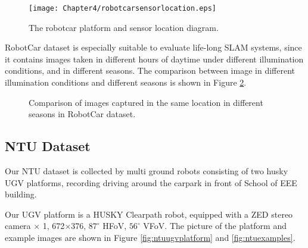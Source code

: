 \begin{figure}[H]
	\centering
	\texttt{[image: Chapter4/robotcarsensorlocation.eps]}
	\caption{The robotcar platform and sensor location diagram.}
	\label{fig:robotcarsensorlocation} 
\end{figure}

RobotCar dataset is especially suitable to evaluate life-long SLAM systems, since it contains images taken in different hours of daytime under different illumination conditions, and in different seasons. The comparison between image in different illumination conditions and different seasons is shown in Figure \ref{fig:robotcarcomparisonseason}.

\begin{figure}
	\centering
	\caption{Comparison of images captured in the same location in different seasons in RobotCar dataset.}
	\label{fig:robotcarcomparisonseason}
\end{figure}
	
\subsection{NTU Dataset}
\label{sec:ntuinfo}
Our NTU dataset \cite{zhang2018two} is collected by multi ground robots consisting of two husky UGV platforms, recording driving around the carpark in front of School of EEE building.

Our UGV platform is a HUSKY Clearpath robot, equipped with a ZED stereo camera $\times$ 1, 672$\times$376, $87^{\circ}$ HFoV, $56^{\circ}$ VFoV. The picture of the platform and example images are shown in Figure \ref{fig:ntuugvplatform} and \ref{fig:ntuexamples}.


